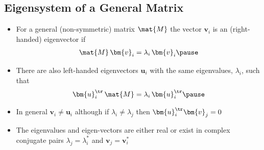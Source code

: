 
\begin{slide}
\section[-1]{Eigensystem of a General Matrix}

\begin{PauseHighLight}
  \begin{itemize}
  \item For a general (non-symmetric) matrix $\mat{M}$ the vector
    $\bm{v}_i$ is an (right-handed) eigenvector if
    \begin{align*}
      \mat{M} \,\bm{v}_i = \lambda_i \, \bm{v}_i\pause
    \end{align*}
  \item There are also left-handed eigenvectors $\bm{u}_i$ with the same
    eigenvalues, $\lambda_i$, such that
    \begin{align*}
      \bm{u}_i^\tr \, \mat{M} = \lambda_i \, \bm{u}_i^\tr \pause
    \end{align*}
  \item In general $\bm{v}_i\neq\bm{u}_i$ although if
    $\lambda_i\neq\lambda_j$ then $\bm{u}_i^\tr \bm{v}_j=0$\pause
  \item The eigenvalues and eigen-vectors are either real or exist
    in complex conjugate pairs $\lambda_j = \lambda_i^*$ and $\bm{v}_j
    = \bm{v}_i^*$\pause
  \end{itemize}
\end{PauseHighLight}
\end{slide}


